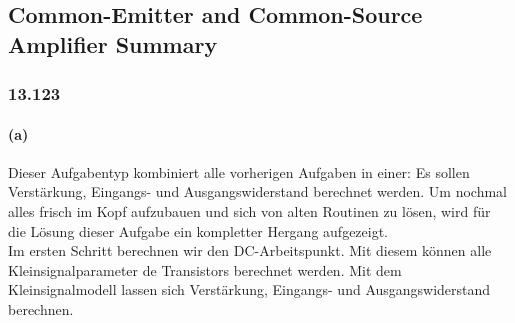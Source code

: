 \documentclass[11pt,a4paper,titlepage]{article}
\begin{document}
\subsection{Common-Emitter and Common-Source Amplifier Summary}
\subsubsection*{13.123}
\paragraph{(a)} Dieser Aufgabentyp kombiniert alle vorherigen Aufgaben in einer: Es sollen Verstärkung, Eingangs- und Ausgangswiderstand berechnet werden. Um nochmal alles frisch im Kopf aufzubauen und sich von alten Routinen zu lösen, wird für die Lösung dieser Aufgabe ein kompletter Hergang aufgezeigt.\\
Im ersten Schritt berechnen wir den DC-Arbeitspunkt. Mit diesem können alle Kleinsignalparameter de Transistors berechnet werden. Mit dem Kleinsignalmodell lassen sich Verstärkung, Eingangs- und Ausgangswiderstand berechnen.\\
\end{document}
